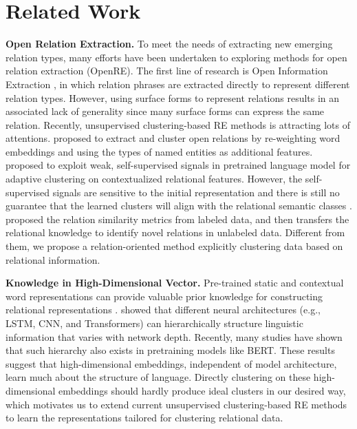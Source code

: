 \documentclass[11pt]{article}
\begin{document}
\section{Related Work}
    \textbf{Open Relation Extraction.} 
        To meet the needs of extracting new emerging relation types, many efforts have been undertaken to exploring methods for open relation extraction (OpenRE). The first line of research is Open Information Extraction \citep{10.1145/1409360.1409378,yates-etal-2007-textrunner,fader-etal-2011-identifying}, in which relation phrases are extracted directly to represent different relation types.
        However, using surface forms to represent relations results in an associated lack of generality since many surface forms can express the same relation. 
        Recently, unsupervised clustering-based RE methods is attracting lots of attentions. \citet{10.1007/978-3-319-70407-4_3} proposed to extract and cluster open relations by re-weighting word embeddings and using the types of named entities as additional features.  \citet{hu2020selfore} proposed to exploit weak, self-supervised signals in pretrained language model for adaptive clustering on contextualized relational features. However, the self-supervised signals are sensitive to the initial representation \citep{vangansbeke2020scan} and there is still no guarantee that the learned clusters will align with the relational semantic classes \citep{10.5555/2968618.2968683}. \citet{wu-etal-2019-open} proposed the relation similarity metrics from labeled data, and then transfers the relational knowledge to identify novel relations in unlabeled data. Different from them, we propose a relation-oriented method explicitly clustering data based on relational information.
        
    \noindent\textbf{Knowledge in High-Dimensional Vector.}
        Pre-trained static and contextual word representations can provide valuable prior knowledge for constructing relational representations \citep{DBLP:journals/corr/abs-1906-03158,10.1007/978-3-319-70407-4_3}. \citet{peters-etal-2018-dissecting} showed that different neural architectures (e.g., LSTM, CNN, and Transformers) can hierarchically structure linguistic information that varies with network depth. 
        Recently, many studies \citep{jawahar-etal-2019-bert,DBLP:journals/corr/abs-1906-04341,DBLP:journals/corr/abs-1901-05287} have shown that such hierarchy also exists in pretraining models like BERT. These results suggest that  high-dimensional embeddings, independent of model architecture, learn much about the structure of language. Directly clustering on these high-dimensional embeddings should hardly produce ideal clusters in our desired way, which motivates us to extend current unsupervised clustering-based RE methods to learn the representations tailored for clustering relational data.
        
\end{document}
